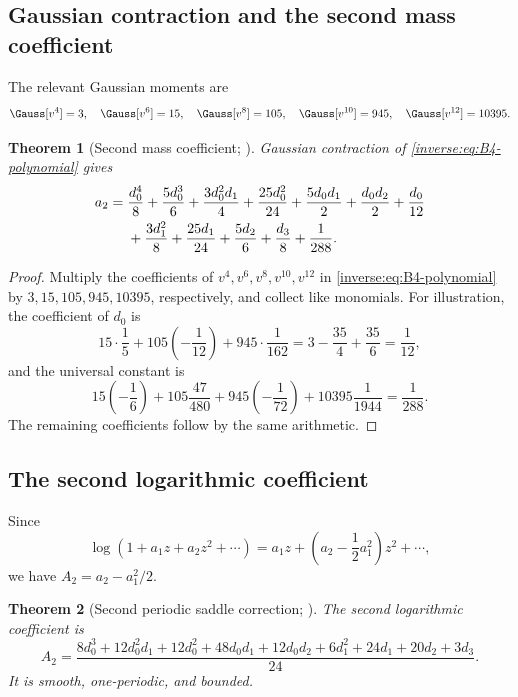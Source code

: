\documentclass[11pt,oneside]{article}
\newtheorem{theorem}{Theorem}[section]
\theoremstyle{definition}
\theoremstyle{remark}
\begin{document}
\subsection{Gaussian contraction and the second mass coefficient}

The relevant Gaussian moments are
\[
 \Gauss[v^4]=3,\quad
 \Gauss[v^6]=15,\quad
 \Gauss[v^8]=105,\quad
 \Gauss[v^{10}]=945,\quad
 \Gauss[v^{12}]=10395.
\]

\begin{theorem}[Second mass coefficient; \Formalized]
\label{inverse:thm:a2}
Gaussian contraction of \eqref{inverse:eq:B4-polynomial} gives
\begin{align}
 a_2={}&
 \frac{d_0^4}{8}+\frac{5d_0^3}{6}
 +\frac{3d_0^2d_1}{4}+\frac{25d_0^2}{24}
 +\frac{5d_0d_1}{2}+\frac{d_0d_2}{2}
 +\frac{d_0}{12} \notag\\
 &+\frac{3d_1^2}{8}+\frac{25d_1}{24}
 +\frac{5d_2}{6}+\frac{d_3}{8}
 +\frac1{288}. \label{inverse:eq:a2}
\end{align}
\end{theorem}

\begin{proof}
Multiply the coefficients of $v^4,v^6,v^8,v^{10},v^{12}$ in
\eqref{inverse:eq:B4-polynomial} by $3,15,105,945,10395$, respectively, and
collect like monomials.  For illustration, the coefficient of $d_0$ is
\[
 15\cdot\frac15
 +105\left(-\frac1{12}\right)
 +945\cdot\frac1{162}
 =3-\frac{35}{4}+\frac{35}{6}
 =\frac1{12},
\]
and the universal constant is
\[
 15\left(-\frac16\right)
 +105\frac{47}{480}
 +945\left(-\frac1{72}\right)
 +10395\frac1{1944}
 =\frac1{288}.
\]
The remaining coefficients follow by the same arithmetic.
\end{proof}

\subsection{The second logarithmic coefficient}

Since
\[
 \log(1+a_1z+a_2z^2+\cdots)
 =a_1z+\left(a_2-\frac12a_1^2\right)z^2+\cdots,
\]
we have $A_2=a_2-a_1^2/2$.

\begin{theorem}[Second periodic saddle correction; \Formalized]
\label{inverse:thm:A2}
The second logarithmic coefficient is
\begin{equation}
 \boxed{
 A_2=
 \frac{
  8d_0^3+12d_0^2d_1+12d_0^2+48d_0d_1+12d_0d_2
  +6d_1^2+24d_1+20d_2+3d_3
 }{24}.}
 \label{inverse:eq:A2}
\end{equation}
It is smooth, one-periodic, and bounded.
\end{theorem}
\end{document}
